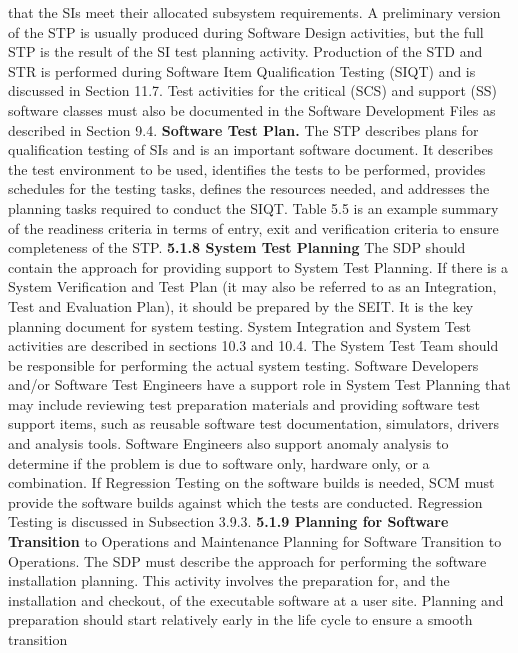 \documentclass{book}
\begin{document}
\begin{multicols}{2}
that the SIs meet their allocated subsystem requirements.
A preliminary version of the STP is usually produced
during Software Design activities, but the full STP is the
result of the SI test planning activity. Production of the STD
and STR is performed during Software Item Qualification
Testing (SIQT) and is discussed in Section 11.7. Test activities for the critical (SCS) and support (SS) software classes
must also be documented in the Software Development Files
as described in Section 9.4.
\textbf{Software Test Plan.} The STP describes plans for qualification testing of SIs and is an important software document.
It describes the test environment to be used, identifies the
tests to be performed, provides schedules for the testing tasks,
defines the resources needed, and addresses the planning
tasks required to conduct the SIQT. Table 5.5 is an example
summary of the readiness criteria in terms of entry, exit and
verification criteria to ensure completeness of the STP.
\textbf{5.1.8 System Test Planning}
The SDP should contain the approach for providing support
to System Test Planning. If there is a System Verification and
Test Plan (it may also be referred to as an Integration, Test and
Evaluation Plan), it should be prepared by the SEIT. It is the key
planning document for system testing. System Integration and
System Test activities are described in sections 10.3 and 10.4.
The System Test Team should be responsible for performing the actual system testing. Software Developers and/or
Software Test Engineers have a support role in System Test
Planning that may include reviewing test preparation materials and providing software test support items, such as reusable software test documentation, simulators, drivers and
analysis tools. Software Engineers also support anomaly
analysis to determine if the problem is due to software only,
hardware only, or a combination. If Regression Testing on
the software builds is needed, SCM must provide the software builds against which the tests are conducted. Regression
Testing is discussed in Subsection 3.9.3.
\textbf{5.1.9 Planning for Software Transition}
to Operations and Maintenance
Planning for Software Transition to Operations. The
SDP must describe the approach for performing the software
installation planning. This activity involves the preparation
for, and the installation and checkout, of the executable software at a user site. Planning and preparation should start
relatively early in the life cycle to ensure a smooth transition 


\end{multicols}
\end{document}
